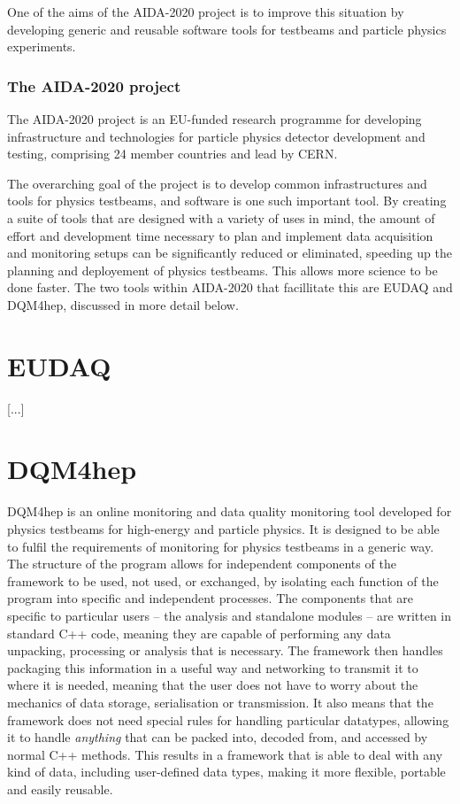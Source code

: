 One of the aims of the AIDA-2020 project is to improve this situation by developing generic and reusable software tools for testbeams and particle physics experiments.

\subsubsection{The AIDA-2020 project}
The AIDA-2020 project is an EU-funded research programme for developing infrastructure and technologies for particle physics detector development and testing, comprising 24 member countries and lead by CERN.

The overarching goal of the project is to develop common infrastructures and tools for physics testbeams, and software is one such important tool. By creating a suite of tools that are designed with a variety of uses in mind, the amount of effort and development time necessary to plan and implement data acquisition and monitoring setups can be significantly reduced or eliminated, speeding up the planning and deployement of physics testbeams. This allows more science to be done faster. The two tools within AIDA-2020 that facillitate this are EUDAQ and DQM4hep, discussed in more detail below.

\section{EUDAQ}
[...]

\section{DQM4hep}
DQM4hep is an online monitoring and data quality monitoring tool developed for physics testbeams for high-energy and particle physics. It is designed to be able to fulfil the requirements of monitoring for physics testbeams in a generic way. The structure of the program allows for independent components of the framework to be used, not used, or exchanged, by isolating each function of the program into specific and independent processes. The components that are specific to particular users -- the analysis and standalone modules -- are written in standard C++ code, meaning they are capable of performing any data unpacking, processing or analysis that is necessary. The framework then handles packaging this information in a useful way and networking to transmit it to where it is needed, meaning that the user does not have to worry about the mechanics of data storage, serialisation or transmission. It also means that the framework does not need special rules for handling particular datatypes, allowing it to handle \emph{anything} that can be packed into, decoded from, and accessed by normal C++ methods. This results in a framework that is able to deal with any kind of data, including user-defined data types, making it more flexible, portable and easily reusable.

